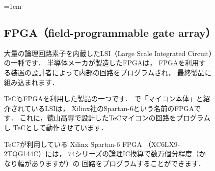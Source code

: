 \begin{figure}[bt]
\begin{framed}{\parindent=1em
\subsection*{FPGA（field-programmable gate array）}
大量の論理回路素子を内蔵したLSI（Large Scale Integrated Circuit）の一種です．
半導体メーカが製造したFPGAは，
FPGAを利用する装置の設計者によって内部の回路をプログラムされ，
最終製品に組み込まれます．

TeCもFPGAを利用した製品の一つです．
で「マイコン本体」と紹介されているLSIは，
Xilinx社のSpartan-6という名前のFPGAです．
これに，徳山高専で設計したTeCマイコンの回路をプログラムし
TeCとして動作させています．

TeC7が利用している Xilinx Spartan-6 FPGA （XC6LX9-2TQG144C）には，
74シリーズの論理IC換算で数万個分程度（かなり幅がありますが）の
回路をプログラムすることができます．
}\end{framed}
\end{figure}
\vfill

